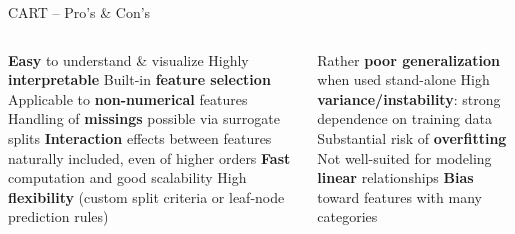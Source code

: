 
\begin{frame}{CART -- Pro's \& Con's}

\begin{columns}[onlytextwidth]
  \begin{column}{0.5\textwidth}
    \footnotesize
    \begin{itemize}
      \positem \textbf{Easy} to understand \& visualize
      \positem Highly \textbf{interpretable}
      \positem Built-in \textbf{feature selection}
      \positem Applicable to \textbf{non-numerical} features
      \positem Handling of \textbf{missings} possible via surrogate splits
      \positem \textbf{Interaction} effects between features naturally included, 
      even of higher orders
      \positem \textbf{Fast} computation and good scalability
      \positem High \textbf{flexibility} (custom split criteria or leaf-node 
      prediction rules)   
    \end{itemize}
  \end{column}
  \begin{column}{0.5\textwidth}
    \footnotesize
    \begin{itemize}
      \negitem Rather \textbf{poor generalization} when used stand-alone 
      \negitem High \textbf{variance/instability}: strong dependence on training 
      data
      \negitem Substantial risk of \textbf{overfitting}
      \negitem Not well-suited for modeling \textbf{linear} relationships
      \negitem \textbf{Bias} toward features with many categories
    \end{itemize}
  \end{column}
\end{columns}

\vfill

\small


\end{frame}


